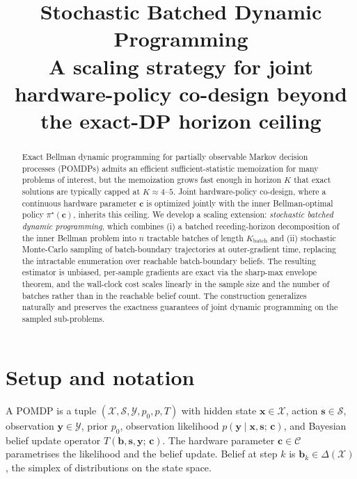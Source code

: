 \documentclass[11pt,a4paper]{article}
\title{Stochastic Batched Dynamic Programming\\
       \large A scaling strategy for joint hardware-policy co-design beyond the exact-DP horizon ceiling}
\author{}
\date{}
\newcommand{\bc}{\bm{c}}
\newcommand{\bx}{\bm{x}}
\newcommand{\by}{\bm{y}}
\newcommand{\bs}{\bm{s}}
\newcommand{\bb}{\bm{b}}
\begin{document}
\maketitle

\begin{abstract}
Exact Bellman dynamic programming for partially observable Markov decision processes (POMDPs)
admits an efficient sufficient-statistic memoization for many problems of interest, but the
memoization grows fast enough in horizon $K$ that exact solutions are typically capped at
$K \approx 4$--$5$.  Joint hardware-policy co-design, where a continuous hardware parameter
$\bc$ is optimized jointly with the inner Bellman-optimal policy $\pi^\star(\bc)$, inherits this
ceiling.  We develop a scaling extension: \emph{stochastic batched dynamic programming},
which combines (i) a batched receding-horizon decomposition of the inner Bellman problem
into $n$ tractable batches of length $K_\mathrm{batch}$ and (ii) stochastic Monte-Carlo
sampling of batch-boundary trajectories at outer-gradient time, replacing the intractable
enumeration over reachable batch-boundary beliefs.  The resulting estimator is unbiased,
per-sample gradients are exact via the sharp-max envelope theorem, and the wall-clock cost
scales linearly in the sample size and the number of batches rather than in the reachable
belief count.  The construction generalizes naturally and preserves the exactness
guarantees of joint dynamic programming on the sampled sub-problems.
\end{abstract}

\tableofcontents

\section{Setup and notation}
\label{sec:setup}

A POMDP is a tuple $(\mathcal{X}, \mathcal{S}, \mathcal{Y}, p_0, p, T)$ with hidden state
$\bx \in \mathcal{X}$, action $\bs \in \mathcal{S}$, observation $\by \in \mathcal{Y}$,
prior $p_0$, observation likelihood $p(\by \mid \bx, \bs;\, \bc)$, and Bayesian belief
update operator $T(\bb, \bs, \by;\, \bc)$.  The hardware parameter $\bc \in \mathcal{C}$
parametrises the likelihood and the belief update.  Belief at step $k$ is
$\bb_k \in \Delta(\mathcal{X})$, the simplex of distributions on the state space.
\end{document}
